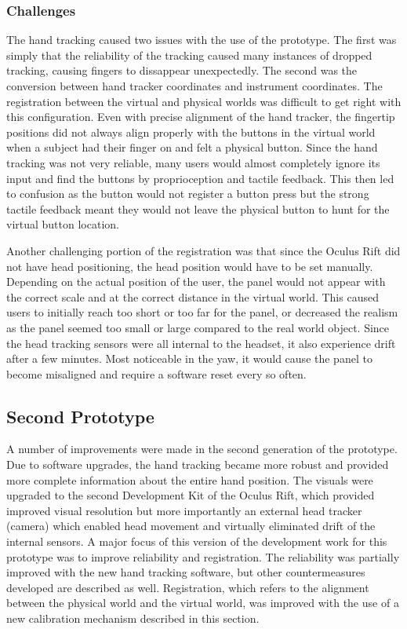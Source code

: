 \subsubsection{Challenges}

The hand tracking caused two issues with the use of the prototype.
The first was simply that the reliability of the tracking caused many instances of dropped tracking, causing fingers to dissappear unexpectedly.
The second was the conversion between hand tracker coordinates and instrument coordinates.
The registration between the virtual and physical worlds was difficult to get right with this configuration.
Even with precise alignment of the hand tracker, the fingertip positions did not always align properly with the buttons in the virtual world when a subject had their finger on and felt a physical button.
Since the hand tracking was not very reliable, many users would almost completely ignore its input and find the buttons by proprioception and tactile feedback.
This then led to confusion as the button would not register a button press but the strong tactile feedback meant they would not leave the physical button to hunt for the virtual button location.

Another challenging portion of the registration was that since the Oculus Rift did not have head positioning, the head position would have to be set manually.
Depending on the actual position of the user, the panel would not appear with the correct scale and at the correct distance in the virtual world.
This caused users to initially reach too short or too far for the panel, or decreased the realism as the panel seemed too small or large compared to the real world object.
Since the head tracking sensors were all internal to the headset, it also experience drift after a few minutes.
Most noticeable in the yaw, it would cause the panel to become misaligned and require a software reset every so often.

\subsection{Second Prototype}

A number of improvements were made in the second generation of the prototype.
Due to software upgrades, the hand tracking became more robust and provided more complete information about the entire hand position.
The visuals were upgraded to the second Development Kit of the Oculus Rift, which provided improved visual resolution but more importantly an external head tracker (camera) which enabled head movement and virtually eliminated drift of the internal sensors.
A major focus of this version of the development work for this prototype was to improve reliability and registration.
The reliability was partially improved with the new hand tracking software, but other countermeasures developed are described as well.
Registration, which refers to the alignment between the physical world and the virtual world, was improved with the use of a new calibration mechanism described in this section.

